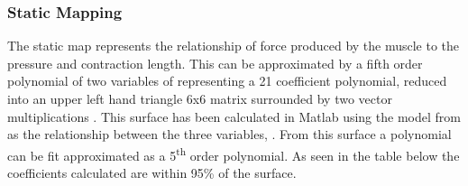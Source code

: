 \documentclass[11pt,a4paper]{article}
\begin{document}
\subsubsection{Static Mapping}
\label{sub:static_mapping}
The static map represents the relationship of force produced by the muscle to the pressure and contraction length. This can be approximated by a fifth order polynomial of two variables of representing a 21 coefficient polynomial, reduced into an upper left hand triangle 6x6 matrix surrounded by two vector multiplications . This surface has been calculated in Matlab using the model from \cite{martens_boblan_2017} as the relationship between the three variables, . From this surface a polynomial can be fit approximated as a 5\textsuperscript{th} order polynomial. As seen in the table below  the coefficients calculated are within 95\% of the surface.
\end{document}
